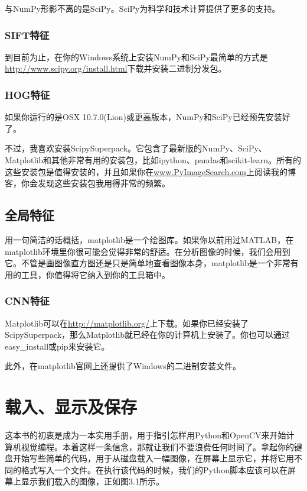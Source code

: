 \documentclass[color=cyan,mathpazo,titlestyle=hang]{elegantbook}
\begin{document}
与NumPy形影不离的是SciPy。SciPy为科学和技术计算提供了更多的支持。

\subsection{SIFT特征}

到目前为止，在你的Windows系统上安装NumPy和SciPy最简单的方式是\url{http://www.scipy.org/install.html}下载并安装二进制分发包。

\subsection{HOG特征}

如果你运行的是OSX 10.7.0(Lion)或更高版本，NumPy和SciPy已经预先安装好了。

不过，我喜欢安装ScipySuperpack。它包含了最新版的NumPy、SciPy、Matplotlib和其他非常有用的安装包，比如ipython、pandas和scikit-learn。所有的这些安装包是值得安装的，并且如果你在\url{www.PyImageSearch.com}上阅读我的博客，你会发现这些安装包我用得非常的频繁。

\section{全局特征}

用一句简洁的话概括，matplotlib是一个绘图库。如果你以前用过MATLAB，在matplotlib环境里你很可能会觉得非常的舒适。在分析图像的时候，我们会用到它。不管是画图像直方图还是只是简单地查看图像本身，matplotlib是一个非常有用的工具，你值得将它纳入到你的工具箱中。

\subsection{CNN特征}

Matplotlib可以在\url{http://matplotlib.org/}上下载。如果你已经安装了ScipySuperpack，那么Matplotlib就已经在你的计算机上安装了。你也可以通过easy\_install或pip来安装它。

此外，在matplotlib官网上还提供了Windows的二进制安装文件。

\chapter{载入、显示及保存}

这本书的初衷是成为一本实用手册，用于指引怎样用Python和OpenCV来开始计算机视觉编程。本着这样一条信念，那就让我们不要浪费任何时间了。拿起你的键盘开始写些简单的代码，用于从磁盘载入一幅图像，在屏幕上显示它，并将它用不同的格式写入一个文件。在执行该代码的时候，我们的Python脚本应该可以在屏幕上显示我们载入的图像，正如图3.1所示。
\end{document}
